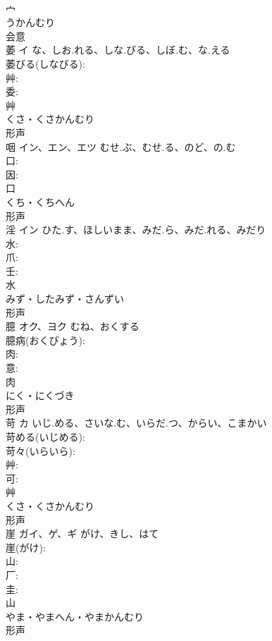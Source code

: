 \documentclass[8pt]{extreport}
\begin{document}
\begin{CJK}{UTF8}{min}
\\	宀	
\\	うかんむり	
\\	会意 
\\	萎	イ	な、しお.れる、しな.びる、しぼ.む、な.える		
\\	萎びる(しなびる): 
\\	艸: 
\\	委: 
\\	艸	
\\	くさ・くさかんむり	
\\	形声 
\\	咽	イン、エン、エツ	むせ.ぶ、むせ.る、のど、の.む		
\\	口: 
\\	因: 
\\	口	
\\	くち・くちへん	
\\	形声 
\\	淫	イン	ひた.す、ほしいまま、みだ.ら、みだ.れる、みだり		
\\	水: 
\\	爪: 
\\	壬: 
\\	水	
\\	みず・したみず・さんずい	
\\	形声 
\\	臆	オク、ヨク	むね、おくする		
\\	臆病(おくびょう): 
\\	肉: 
\\	意: 
\\	肉	
\\	にく・にくづき	
\\	形声 
\\	苛	カ	いじ.める、さいな.む、いらだ.つ、からい、こまかい		
\\	苛める(いじめる): 
\\	苛々(いらいら): 
\\	艸: 
\\	可: 
\\	艸	
\\	くさ・くさかんむり	
\\	形声 
\\	崖	ガイ、ゲ、ギ	がけ、きし、はて		
\\	崖(がけ): 
\\	山: 
\\	厂: 
\\	圭: 
\\	山	
\\	やま・やまへん・やまかんむり	
\\	形声 

\end{CJK}
\end{document}
